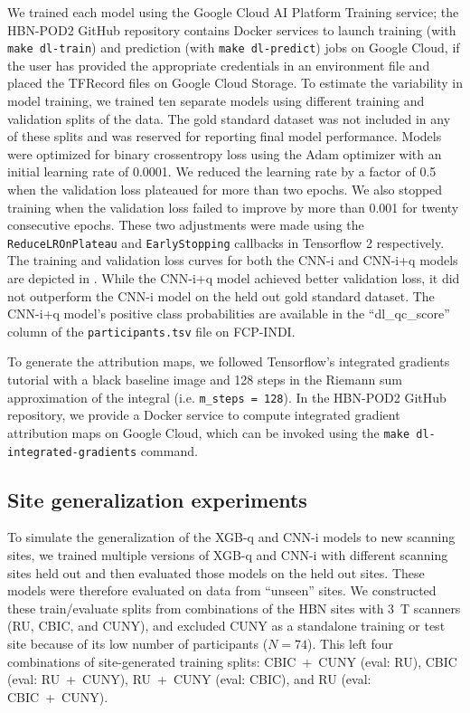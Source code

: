 \documentclass[fleqn,10pt,inline]{wlscirep}
\begin{document}
We trained each model using the Google Cloud AI Platform Training service;
the HBN-POD2 GitHub repository contains Docker services to launch training (with
\texttt{make dl-train}) and prediction (with \texttt{make dl-predict}) jobs on
Google Cloud, if the user has provided the appropriate credentials in an
environment file and placed the TFRecord files on Google Cloud Storage. To
estimate the variability in model training, we trained ten separate models using
different training and validation splits of the data. The gold standard dataset
was not included in any of these splits and was reserved for reporting final
model performance. Models were optimized for binary crossentropy loss using the
Adam optimizer \cite{kingma2017adam} with an initial learning rate of 0.0001. We
reduced the learning rate by a factor of 0.5 when the validation loss plateaued
for more than two epochs. We also stopped training when the validation loss
failed to improve by more than 0.001 for twenty consecutive epochs. These two
adjustments were made using the \texttt{ReduceLROnPlateau} and
\texttt{EarlyStopping} callbacks in Tensorflow 2 \cite{tensorflow} respectively.
The training and validation loss curves for both the CNN-i and CNN-i+q models
are depicted in . While the CNN-i+q model achieved
better validation loss, it did not outperform the CNN-i model on the held out
gold standard dataset. The CNN-i+q model's positive class probabilities are
available in the ``dl\_qc\_score'' column of the \texttt{participants.tsv} file on
FCP-INDI.

To generate the attribution maps, we followed Tensorflow's integrated gradients
tutorial \cite{integrated-gradients-tutorial} with a black baseline image and
128 steps in the Riemann sum approximation of the integral (i.e.
\texttt{m\_steps = 128}). In the HBN-POD2 GitHub repository, we provide a Docker
service to compute integrated gradient attribution maps on Google Cloud, which
can be invoked using the \texttt{make dl-integrated-gradients} command.

\subsection*{Site generalization experiments}

To simulate the generalization of the XGB-q and CNN-i models to new scanning sites, we trained multiple versions of XGB-q and CNN-i with different scanning sites held out and then evaluated those models on the held out sites. These models were therefore evaluated on data from ``unseen'' sites. We constructed these train/evaluate splits from combinations of the HBN sites with \qty{3}{\tesla} scanners (RU, CBIC, and CUNY), and excluded CUNY as a standalone training or test site because of its low number of participants ($N=74$). This left four combinations of site-generated training splits: CBIC~+~CUNY (eval: RU), CBIC (eval: RU~+~CUNY), RU~+~CUNY (eval: CBIC), and RU (eval: CBIC~+~CUNY).
\end{document}
